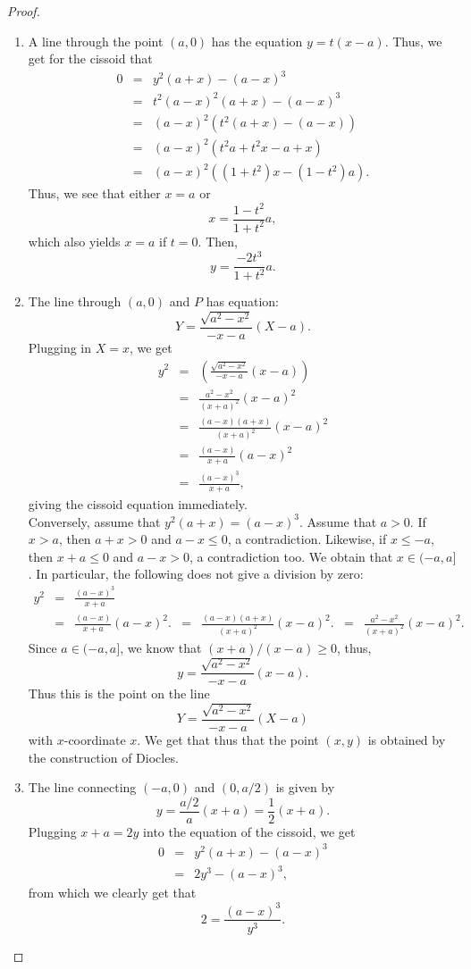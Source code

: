 \begin{proof}
\begin{enumerate}
    \item A line through the point $(a,0)$ has the equation $y = t(x-a)$. Thus, we get for the cissoid that
    \begin{eqnarray*}
        0
        & = & y^2 (a+x) - (a-x)^3\\
        & = & t^2 (a-x)^2 (a+x) - (a-x)^3\\
        & = & (a-x)^2 ( t^2 (a+x) - (a-x))\\
        & = & (a-x)^2 ( t^2 a + t^2 x - a + x)\\
        & = & (a-x)^2 ( (1+t^2)x - (1 - t^2)a).
    \end{eqnarray*}
    Thus, we see that either $x=a$ or
    $$x = \frac{1-t^2}{1+t^2}a,$$
    which also yields $x=a$ if $t=0$. Then,
    $$y = \frac{-2t^3}{1+t^2}a.$$
    \item The line through $(a,0)$ and $P$ has equation:
    $$Y = \frac{\sqrt{a^2 - x^2}}{-x-a}(X-a).$$
    Plugging in $X = x$, we get
    \begin{eqnarray*}
        y^2
        & = & \left(\frac{\sqrt{a^2 - x^2}}{-x-a}(x-a)\right)\\
        & = & \frac{a^2 - x^2}{(x+a)^2}(x-a)^2\\
        & = & \frac{(a-x)(a+x)}{(x+a)^2}(x-a)^2\\
        & = & \frac{(a-x)}{x+a}(a-x)^2\\
        & = & \frac{(a-x)^3}{x+a},
    \end{eqnarray*}
    giving the cissoid equation immediately.\\
    Conversely, assume that $y^2 (a+x) = (a-x)^3$. Assume that $a>0$. If $x>a$, then $a+x>0$ and $a-x\leq 0$, a contradiction. Likewise, if $x\leq -a$, then $x+a\leq 0$ and $a-x>0$, a contradiction too. We obtain that $x\in (-a,a]$. In particular, the following does not give a division by zero:
    \begin{eqnarray*}
        y^2
        & = & \frac{(a-x)^3}{x+a}\\
        & = & \frac{(a-x)}{x+a}(a-x)^2.
        & = & \frac{(a-x)(a+x)}{(x+a)^2}(x-a)^2.
        & = & \frac{a^2 - x^2}{(x+a)^2}(x-a)^2.    
    \end{eqnarray*}
    Since $a\in (-a,a]$, we know that $(x+a)/(x-a)\geq 0$, thus,
    $$y = \frac{\sqrt{a^2 - x^2}}{-x-a}(x-a).$$
    Thus this is the point on the line
    $$Y = \frac{\sqrt{a^2 - x^2}}{-x-a}(X-a)$$
    with $x$-coordinate $x$. We get that thus that the point $(x,y)$ is obtained by the construction of Diocles.
    \item The line connecting $(-a,0)$ and $(0,a/2)$ is given by
    $$y = \frac{a/2}{a}(x+a) = \frac{1}{2}(x+a).$$
    Plugging $x+a = 2y$ into the equation of the cissoid, we get
    \begin{eqnarray*}
        0
        & = & y^2 (a+x) - (a-x)^3\\
        & = & 2y^3 - (a-x)^3,
    \end{eqnarray*}
    from which we clearly get that
    $$2 = \frac{(a-x)^3}{y^3}.$$
\end{enumerate}
\end{proof}

